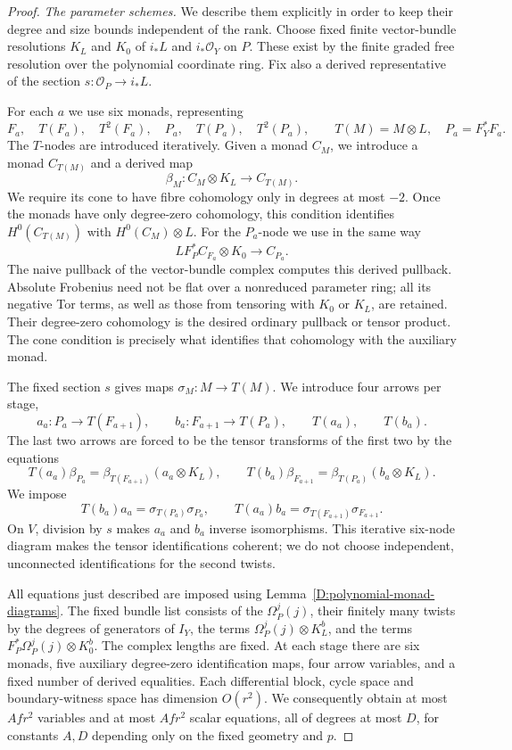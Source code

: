 \begin{proof}
\emph{The parameter schemes.}
We describe them explicitly in order to keep their degree and size bounds
independent of the rank. Choose fixed finite vector-bundle resolutions
$K_L$ and $K_0$ of $i_*L$ and $i_*\mathcal O_Y$ on $P$. These exist by
the finite graded free resolution over the polynomial coordinate ring.
Fix also a derived representative of the section
$s:\mathcal O_P\to i_*L$.

For each $a$ we use six monads, representing
\[
 F_a,\quad T(F_a),\quad T^2(F_a),\quad
 P_a,\quad T(P_a),\quad T^2(P_a),\qquad
 T(M)=M\otimes L,\quad P_a=F_Y^*F_a.
\]
The $T$-nodes are introduced iteratively. Given a monad $C_M$, we introduce
a monad $C_{T(M)}$ and a derived map
\[
 \beta_M:C_M\otimes K_L\longrightarrow C_{T(M)}.
\]
We require its cone to have fibre cohomology only in degrees at most $-2$.
Once the monads have only degree-zero cohomology, this condition identifies
$H^0(C_{T(M)})$ with $H^0(C_M)\otimes L$. For the $P_a$-node we use in
the same way
\[
 LF_P^*C_{F_a}\otimes K_0\longrightarrow C_{P_a}.
\]
The naive pullback of the vector-bundle complex computes this derived
pullback. Absolute Frobenius need not be flat over a nonreduced parameter
ring; all its negative Tor terms, as well as those from tensoring with
$K_0$ or $K_L$, are retained. Their degree-zero cohomology is the desired
ordinary pullback or tensor product. The cone condition is precisely what
identifies that cohomology with the auxiliary monad.

The fixed section $s$ gives maps $\sigma_M:M\to T(M)$. We introduce four
arrows per stage,
\[
 a_a:P_a\to T(F_{a+1}),\qquad
 b_a:F_{a+1}\to T(P_a),\qquad T(a_a),\qquad T(b_a).
\]
The last two arrows are forced to be the tensor transforms of the first
two by the equations
\[
 T(a_a)\beta_{P_a}
   =\beta_{T(F_{a+1})}(a_a\otimes K_L),\qquad
 T(b_a)\beta_{F_{a+1}}
   =\beta_{T(P_a)}(b_a\otimes K_L).
\]
We impose
\[
 T(b_a)a_a=\sigma_{T(P_a)}\sigma_{P_a},\qquad
 T(a_a)b_a=\sigma_{T(F_{a+1})}\sigma_{F_{a+1}}.
\]
On $V$, division by $s$ makes $a_a$ and $b_a$ inverse isomorphisms.
This iterative six-node diagram makes the tensor identifications
coherent; we do not choose independent, unconnected identifications
for the second twists.

All equations just described are imposed using
Lemma~\ref{D:polynomial-monad-diagrams}. The fixed bundle list consists of
the $\Omega_P^j(j)$, their finitely many twists by the degrees of generators
of $I_Y$, the terms $\Omega_P^j(j)\otimes K_L^b$, and the terms
$F_P^*\Omega_P^j(j)\otimes K_0^b$. The complex lengths are fixed. At each
stage there are six monads, five auxiliary degree-zero identification
maps, four arrow variables, and a fixed number of derived equalities.
Each differential block, cycle space and boundary-witness space has
dimension $O(r^2)$. We consequently obtain at most $Afr^2$ variables
and at most $Afr^2$ scalar equations, all of degrees at most $D$, for
constants $A,D$ depending only on the fixed geometry and $p$.


\end{proof}
